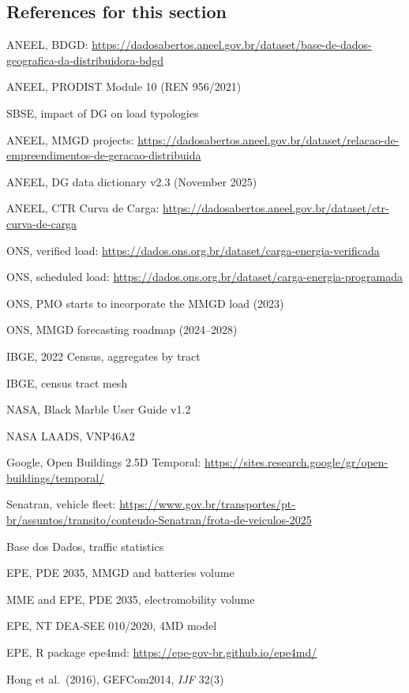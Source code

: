 \subsection*{References for this section}
{\small
\begin{enumerate}[label={[\arabic*]},leftmargin=2.2em,itemsep=1pt]
\item ANEEL, BDGD: \url{https://dadosabertos.aneel.gov.br/dataset/base-de-dados-geografica-da-distribuidora-bdgd}
\item ANEEL, PRODIST Module 10 (REN 956/2021)
\item SBSE, impact of DG on load typologies
\item ANEEL, MMGD projects: \url{https://dadosabertos.aneel.gov.br/dataset/relacao-de-empreendimentos-de-geracao-distribuida}
\item ANEEL, DG data dictionary v2.3 (November 2025)
\item ANEEL, CTR Curva de Carga: \url{https://dadosabertos.aneel.gov.br/dataset/ctr-curva-de-carga}
\item ONS, verified load: \url{https://dados.ons.org.br/dataset/carga-energia-verificada}
\item ONS, scheduled load: \url{https://dados.ons.org.br/dataset/carga-energia-programada}
\item ONS, PMO starts to incorporate the MMGD load (2023)
\item ONS, MMGD forecasting roadmap (2024--2028)
\item IBGE, 2022 Census, aggregates by tract
\item IBGE, census tract mesh
\item NASA, Black Marble User Guide v1.2
\item NASA LAADS, VNP46A2
\item Google, Open Buildings 2.5D Temporal: \url{https://sites.research.google/gr/open-buildings/temporal/}
\item Senatran, vehicle fleet: \url{https://www.gov.br/transportes/pt-br/assuntos/transito/conteudo-Senatran/frota-de-veiculos-2025}
\item Base dos Dados, traffic statistics
\item EPE, PDE 2035, MMGD and batteries volume
\item MME and EPE, PDE 2035, electromobility volume
\item EPE, NT DEA-SEE 010/2020, 4MD model
\item EPE, R package epe4md: \url{https://epe-gov-br.github.io/epe4md/}
\item Hong et al.\ (2016), GEFCom2014, \emph{IJF} 32(3)

\end{enumerate}}
